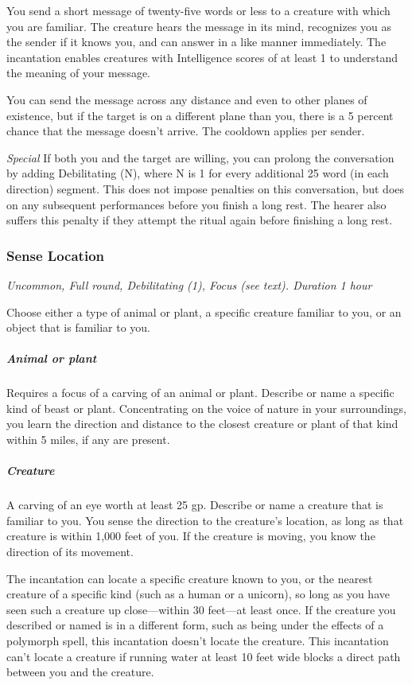 You send a short message of twenty-five words or less to a creature with which you are familiar. The creature hears the message in its mind, recognizes you as the sender if it knows you, and can answer in a like manner immediately. The incantation enables creatures with Intelligence scores of at least 1 to understand the meaning of your message.

You can send the message across any distance and even to other planes of existence, but if the target is on a different plane than you, there is a 5 percent chance that the message doesn't arrive. The cooldown applies per sender.

\textit{Special} If both you and the target are willing, you can prolong the conversation by adding Debilitating (N), where N is 1 for every additional 25 word (in each direction) segment. This does not impose penalties on this conversation, but does on any subsequent performances before you finish a long rest. The hearer also suffers this penalty if they attempt the ritual again before finishing a long rest.

\subsubsection{Sense Location}
\textit{Uncommon, Full round, Debilitating (1), Focus (see text). Duration 1 hour}

Choose either a type of animal or plant, a specific creature familiar to you, or an object that is familiar to you.

\subparagraph*{Animal or plant} Requires a focus of a carving of an animal or plant. Describe or name a specific kind of beast or plant. Concentrating on the voice of nature in your surroundings, you learn the direction and distance to the closest creature or plant of that kind within 5 miles, if any are present.

\subparagraph*{Creature} A carving of an eye worth at least 25 gp. Describe or name a creature that is familiar to you. You sense the direction to the creature's location, as long as that creature is within 1,000 feet of you. If the creature is moving, you know the direction of its movement.

The incantation can locate a specific creature known to you, or the nearest creature of a specific kind (such as a human or a unicorn), so long as you have seen such a creature up close—within 30 feet—at least once. If the creature you described or named is in a different form, such as being under the effects of a polymorph spell, this incantation doesn't locate the creature. This incantation can't locate a creature if running water at least 10 feet wide blocks a direct path between you and the creature.

